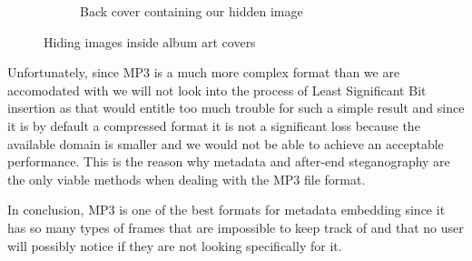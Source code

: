 \begin{figure}[H]
\begin{subfigure}{.5\textwidth}
    \caption{Back cover containing our hidden image}
    \label{me_irl_backcover}
\end{subfigure}
\caption{Hiding images inside album art covers}
\end{figure}

Unfortunately, since MP3 is a much more complex format than we are accomodated with we will not look into the process of Least Significant Bit insertion as that would entitle too much trouble for such a simple result and since it is by default a compressed format it is not a significant loss because the available domain is smaller and we would not be able to achieve an acceptable performance. This is the reason why metadata and after-end steganography are the only viable methods when dealing with the MP3 file format.

In conclusion, MP3 is one of the best formats for metadata embedding since it has so many types of frames that are impossible to keep track of and that no user will possibly notice if they are not looking specifically for it. 